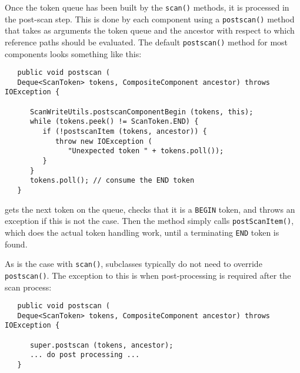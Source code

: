 \documentclass{article}
\begin{document}
Once the token queue has been built by the {\tt scan()} methods, it is
processed in the post-scan step. This is done by each component using
a {\tt postscan()} method that takes as arguments the token queue and
the ancestor with respect to which reference paths should be
evaluated. The default {\tt postscan()} method for most components
looks something like this:
\begin{lstlisting}
   public void postscan (
   Deque<ScanToken> tokens, CompositeComponent ancestor) throws IOException {

      ScanWriteUtils.postscanComponentBegin (tokens, this);
      while (tokens.peek() != ScanToken.END) {
         if (!postscanItem (tokens, ancestor)) {
            throw new IOException (
               "Unexpected token " + tokens.poll());
         }
      }
      tokens.poll(); // consume the END token
   }   
\end{lstlisting}
gets the next token on the queue, checks that it is a {\tt BEGIN}
token, and throws an exception if this is not the case.  Then the
method simply calls {\tt postScanItem()}, which does the actual token
handling work, until a terminating {\tt END} token is found.

As is the case with {\tt scan()}, subclasses typically do not need
to override {\tt postscan()}. The exception to this is when
post-processing is required after the scan process:
\begin{lstlisting}
   public void postscan (
   Deque<ScanToken> tokens, CompositeComponent ancestor) throws IOException {

      super.postscan (tokens, ancestor);
      ... do post processing ...
   }    
\end{lstlisting}
\end{document}

